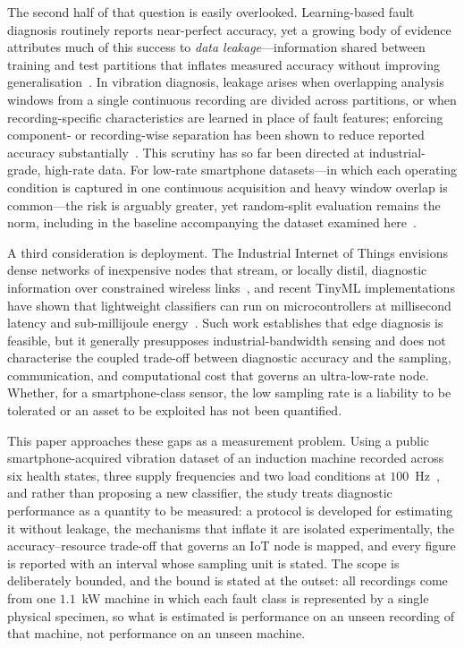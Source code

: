 The second half of that question is easily overlooked. Learning-based fault
diagnosis routinely reports near-perfect accuracy, yet a growing body of evidence
attributes much of this success to \emph{data leakage}---information shared
between training and test partitions that inflates measured accuracy without
improving generalisation~\cite{kapoor2023leakage}. In vibration diagnosis, leakage
arises when overlapping analysis windows from a single continuous recording are
divided across partitions, or when recording-specific characteristics are learned
in place of fault features; enforcing component- or recording-wise separation has
been shown to reduce reported accuracy substantially~\cite{wheat2024impact,
hendriks2022towards}. This scrutiny has so far been directed at industrial-grade,
high-rate data. For low-rate smartphone datasets---in which each operating
condition is captured in one continuous acquisition and heavy window overlap is
common---the risk is arguably greater, yet random-split evaluation remains the
norm, including in the baseline accompanying the dataset examined
here~\cite{ertargin2026smartphone}.

A third consideration is deployment. The Industrial Internet of Things envisions
dense networks of inexpensive nodes that stream, or locally distil, diagnostic
information over constrained wireless links~\cite{yousuf2024iot}, and recent
TinyML implementations have shown that lightweight classifiers can run on
microcontrollers at millisecond latency and sub-millijoule
energy~\cite{gao2025edge, asutkar2023tinyml}. Such work establishes that edge
diagnosis is feasible, but it generally presupposes industrial-bandwidth sensing
and does not characterise the coupled trade-off between diagnostic accuracy and
the sampling, communication, and computational cost that governs an ultra-low-rate
node. Whether, for a smartphone-class sensor, the low sampling rate is a liability
to be tolerated or an asset to be exploited has not been quantified.

This paper approaches these gaps as a measurement problem. Using a public
smartphone-acquired vibration dataset of an induction machine recorded across six
health states, three supply frequencies and two load conditions at
$100$~Hz~\cite{ertargin2026smartphone, ertargin2026dataset}, and rather than
proposing a new classifier, the study treats diagnostic performance as a quantity
to be measured: a protocol is developed for estimating it without leakage, the
mechanisms that inflate it are isolated experimentally, the accuracy--resource
trade-off that governs an IoT node is mapped, and every figure is reported with an
interval whose sampling unit is stated. The scope is deliberately bounded, and the
bound is stated at the outset: all recordings come from one $1.1$~kW machine in
which each fault class is represented by a single physical specimen, so what is
estimated is performance on an unseen recording of that machine, not performance
on an unseen machine.

